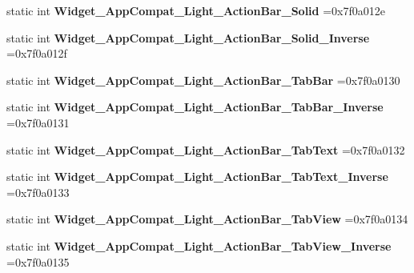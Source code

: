\begin{DoxyCompactItemize}
static int {\bfseries Widget\+\_\+\+App\+Compat\+\_\+\+Light\+\_\+\+Action\+Bar\+\_\+\+Solid} =0x7f0a012e
\item 
\mbox{\label{classandroid_1_1support_1_1v7_1_1cardview_1_1R_1_1style_a345e7d585027387e5389b4c65905aae3}} 
static int {\bfseries Widget\+\_\+\+App\+Compat\+\_\+\+Light\+\_\+\+Action\+Bar\+\_\+\+Solid\+\_\+\+Inverse} =0x7f0a012f
\item 
\mbox{\label{classandroid_1_1support_1_1v7_1_1cardview_1_1R_1_1style_ab91ce6cc678625c7a6f2dd596f12a41e}} 
static int {\bfseries Widget\+\_\+\+App\+Compat\+\_\+\+Light\+\_\+\+Action\+Bar\+\_\+\+Tab\+Bar} =0x7f0a0130
\item 
\mbox{\label{classandroid_1_1support_1_1v7_1_1cardview_1_1R_1_1style_a3cf016fae9f0c42043cde79e2fd7db75}} 
static int {\bfseries Widget\+\_\+\+App\+Compat\+\_\+\+Light\+\_\+\+Action\+Bar\+\_\+\+Tab\+Bar\+\_\+\+Inverse} =0x7f0a0131
\item 
\mbox{\label{classandroid_1_1support_1_1v7_1_1cardview_1_1R_1_1style_a766a3c3f77b8a774242541ff95471551}} 
static int {\bfseries Widget\+\_\+\+App\+Compat\+\_\+\+Light\+\_\+\+Action\+Bar\+\_\+\+Tab\+Text} =0x7f0a0132
\item 
\mbox{\label{classandroid_1_1support_1_1v7_1_1cardview_1_1R_1_1style_add3b973c7a48b802e41c8c5651adde76}} 
static int {\bfseries Widget\+\_\+\+App\+Compat\+\_\+\+Light\+\_\+\+Action\+Bar\+\_\+\+Tab\+Text\+\_\+\+Inverse} =0x7f0a0133
\item 
\mbox{\label{classandroid_1_1support_1_1v7_1_1cardview_1_1R_1_1style_a085c1743fc441b7cd668e6712a8f2835}} 
static int {\bfseries Widget\+\_\+\+App\+Compat\+\_\+\+Light\+\_\+\+Action\+Bar\+\_\+\+Tab\+View} =0x7f0a0134
\item 
\mbox{\label{classandroid_1_1support_1_1v7_1_1cardview_1_1R_1_1style_ac4a5838a44738c12b0a9af078b6089cc}} 
static int {\bfseries Widget\+\_\+\+App\+Compat\+\_\+\+Light\+\_\+\+Action\+Bar\+\_\+\+Tab\+View\+\_\+\+Inverse} =0x7f0a0135

\end{DoxyCompactItemize}

